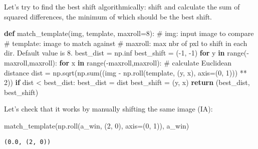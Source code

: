 \documentclass[
  english,
  letterpaper,
  numbers=noendperiod,
  DIV=13]{scrreprt}
\newenvironment{Shaded}{\begin{snugshade}}{\end{snugshade}}
\newcommand{\BuiltInTok}[1]{\textcolor[rgb]{0.00,0.23,0.31}{#1}}
\newcommand{\CommentTok}[1]{\textcolor[rgb]{0.37,0.37,0.37}{#1}}
\newcommand{\ControlFlowTok}[1]{\textcolor[rgb]{0.00,0.23,0.31}{\textbf{#1}}}
\newcommand{\DecValTok}[1]{\textcolor[rgb]{0.68,0.00,0.00}{#1}}
\newcommand{\KeywordTok}[1]{\textcolor[rgb]{0.00,0.23,0.31}{\textbf{#1}}}
\newcommand{\NormalTok}[1]{\textcolor[rgb]{0.00,0.23,0.31}{#1}}
\newcommand{\OperatorTok}[1]{\textcolor[rgb]{0.37,0.37,0.37}{#1}}
\begin{document}
Let's try to find the best shift algorithmically: shift and calculate
the sum of squared differences, the minimum of which should be the best
shift.

\begin{Shaded}
\begin{Highlighting}[]
\KeywordTok{def}\NormalTok{ match\_template(img, template, maxroll}\OperatorTok{=}\DecValTok{8}\NormalTok{):}
    \CommentTok{\# img: input image to compare}
    \CommentTok{\# template: image to match against}
    \CommentTok{\# maxroll: max nbr of pxl to shift in each dir. Default value is 8.}
\NormalTok{    best\_dist }\OperatorTok{=}\NormalTok{ np.inf}
\NormalTok{    best\_shift }\OperatorTok{=}\NormalTok{ (}\OperatorTok{{-}}\DecValTok{1}\NormalTok{, }\OperatorTok{{-}}\DecValTok{1}\NormalTok{)}
    \ControlFlowTok{for}\NormalTok{ y }\KeywordTok{in} \BuiltInTok{range}\NormalTok{(}\OperatorTok{{-}}\NormalTok{maxroll,maxroll):}
        \ControlFlowTok{for}\NormalTok{ x }\KeywordTok{in} \BuiltInTok{range}\NormalTok{(}\OperatorTok{{-}}\NormalTok{maxroll,maxroll):}
            \CommentTok{\# calculate Euclidean distance}
\NormalTok{            dist }\OperatorTok{=}\NormalTok{ np.sqrt(np.}\BuiltInTok{sum}\NormalTok{((img }\OperatorTok{{-}}\NormalTok{ np.roll(template, (y, x), axis}\OperatorTok{=}\NormalTok{(}\DecValTok{0}\NormalTok{, }\DecValTok{1}\NormalTok{))) }\OperatorTok{**} \DecValTok{2}\NormalTok{))}
            \ControlFlowTok{if}\NormalTok{ dist }\OperatorTok{\textless{}}\NormalTok{ best\_dist:}
\NormalTok{                best\_dist }\OperatorTok{=}\NormalTok{ dist}
\NormalTok{                best\_shift }\OperatorTok{=}\NormalTok{ (y, x)}
    \ControlFlowTok{return}\NormalTok{ (best\_dist, best\_shift)}
\end{Highlighting}
\end{Shaded}

Let's check that it works by manually shifting the same image (IA):

\begin{Shaded}
\begin{Highlighting}[]
\NormalTok{match\_template(np.roll(a\_win, (}\DecValTok{2}\NormalTok{, }\DecValTok{0}\NormalTok{), axis}\OperatorTok{=}\NormalTok{(}\DecValTok{0}\NormalTok{, }\DecValTok{1}\NormalTok{)), a\_win)}
\end{Highlighting}
\end{Shaded}

\begin{verbatim}
(0.0, (2, 0))
\end{verbatim}
\end{document}
